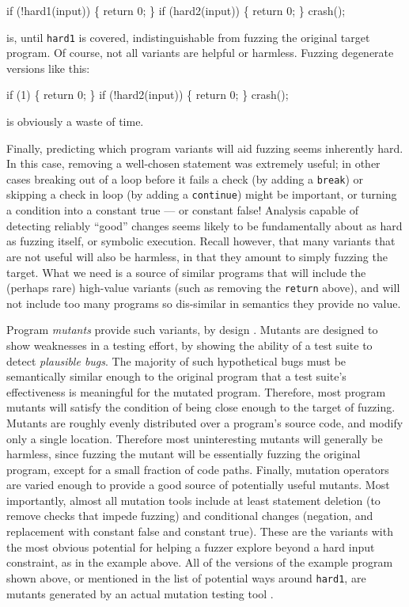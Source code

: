 \begin{code}
  if (!hard1(input)) \{
      return 0;
  \}
  if (hard2(input)) \{
      return 0;
  \}
  crash();
\end{code}

\noindent is, until {\tt hard1} is covered, indistinguishable from fuzzing the original target program.  Of course, not all variants are helpful or harmless.  Fuzzing degenerate versions like this:

\begin{code}
  if (1) \{
      return 0;
  \}
  if (!hard2(input)) \{
      return 0;
  \}
  crash();
\end{code}

\noindent is obviously a waste of time.


Finally, predicting which program variants will aid fuzzing seems
inherently hard.  In this case, removing a well-chosen statement was
extremely useful; in other cases breaking out of a loop before it
fails a check (by adding  a {\tt break}) or skipping a check in loop
(by adding a {\tt continue}) might be important, or turning a condition into a constant true --- or constant false!  Analysis capable of detecting reliably ``good'' changes seems likely to be fundamentally about as hard as fuzzing itself, or symbolic execution.  Recall however, that many variants that are not useful will also be harmless, in that they amount to simply fuzzing the target.  What we need is a source of similar programs that will include the (perhaps rare) high-value variants (such as removing the {\tt return} above), and will not include too many programs so dis-similar in semantics they provide no value.

Program \emph{mutants} provide such variants, by design \cite{MutationSurvey}.  Mutants are designed to show weaknesses in a testing effort, by showing
the ability of a test suite to detect \emph{plausible bugs}.  The majority of such hypothetical bugs must be semantically similar enough to
the original program that a test suite's effectiveness is meaningful for the mutated program.  Therefore, most program mutants
will satisfy the condition of being close enough to the target of fuzzing.  Mutants are roughly evenly distributed over a program's source code,
and modify only a single location.  Therefore most uninteresting mutants will generally be harmless, since fuzzing the mutant will be essentially
fuzzing the original program, except for a small fraction of code paths.  Finally, mutation operators are varied enough to provide a good source
of potentially useful mutants.  Most importantly, almost all mutation tools include at least statement deletion (to remove checks that impede
fuzzing) and conditional changes (negation, and replacement with constant false and constant true).  These are the variants with the most
obvious potential for helping a fuzzer explore beyond a hard input constraint, as in the example above.  All of the versions of the example program shown above, or mentioned in the list of potential ways around {\tt hard1}, are mutants generated by an actual mutation testing tool \cite{RegexpMut}.

